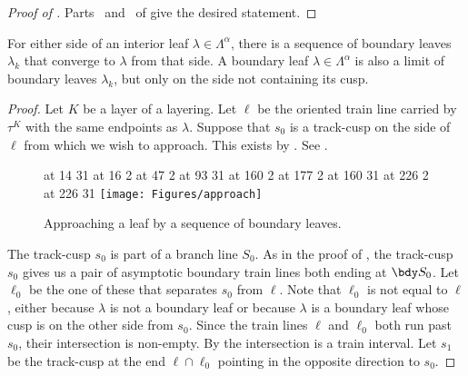 \documentclass[12pt]{amsart}
\begin{document}
\begin{proof}[Proof of ]
Parts~ and~ of  give the desired statement.
\end{proof} 

\begin{lemma}
\label{Lem:Approach}
For either side of an interior leaf $\lambda \in \Lambda^\alpha$, there is a sequence of boundary leaves $\lambda_k$ that converge to $\lambda$ from that side. A boundary leaf $\lambda \in \Lambda^\alpha$ is also a limit of boundary leaves $\lambda_k$, but only on the side not containing its cusp. 
\end{lemma}

\begin{proof}
Let $K$ be a layer of a layering.  Let $\ell$ be the oriented train line carried by $\tau^K$ with the same endpoints as $\lambda$. Suppose that $s_0$ is a track-cusp on the side of $\ell$ from which we wish to approach. This exists by .  See .

\begin{figure}[htbp]
\small\hair 2pt
 at 14 31
 at 16 2
 at 47 2
 at 93 31
 at 160 2
 at 177 2
 at 160 31
 at 226 2
 at 226 31
\endlabellist
\texttt{[image: Figures/approach]}
\caption{Approaching a leaf by a sequence of boundary leaves.}
\label{Fig:Approach}
\end{figure}

The track-cusp $s_0$ is part of a branch line $S_0$. 
As in the proof of , the track-cusp $s_0$ gives us a pair of asymptotic boundary train lines both ending at $\bdy S_0$.  Let $\ell_0$ be the one of these that separates $s_0$ from $\ell$.  Note that $\ell_0$ is not equal to $\ell$, either because $\lambda$ is not a boundary leaf or because $\lambda$ is a boundary leaf whose cusp is on the other side from $s_0$.  Since the train lines $\ell$ and $\ell_0$ both run past $s_0$, their intersection is non-empty.  By  the intersection is a train interval.  Let $s_1$ be the track-cusp at the end $\ell \cap \ell_0$ pointing in the opposite direction to $s_0$.  


\end{proof}
\end{document}
